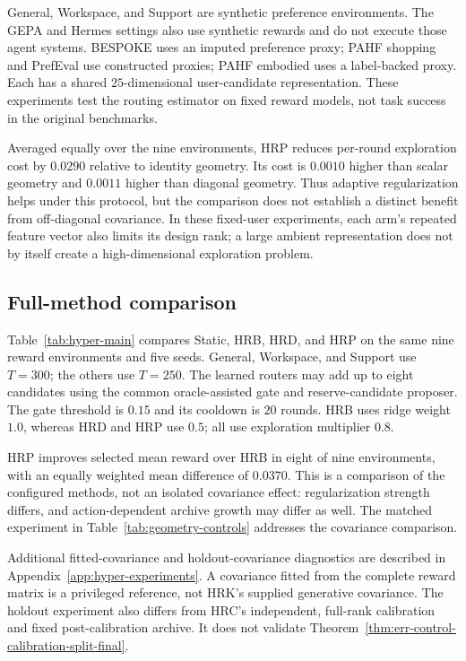 \documentclass{article} %
\begin{document}
General, Workspace, and Support are synthetic preference environments.
The GEPA and Hermes settings also use synthetic rewards and do not execute
those agent systems. BESPOKE uses an imputed preference proxy; PAHF shopping
and PrefEval use constructed proxies; PAHF embodied uses a label-backed
proxy. Each has a shared $25$-dimensional user-candidate representation.
These experiments test the routing estimator on fixed reward models, not
task success in the original benchmarks.



Averaged equally over the nine environments, HRP reduces per-round
exploration cost by $0.0290$ relative to identity geometry. Its cost is
$0.0010$ higher than scalar geometry and $0.0011$ higher than diagonal
geometry. Thus adaptive regularization helps under this protocol, but the
comparison does not establish a distinct benefit from off-diagonal
covariance. In these fixed-user experiments, each arm's repeated feature
vector also limits its design rank; a large ambient representation does
not by itself create a high-dimensional exploration problem.

\FloatBarrier
\subsection{Full-method comparison}
\label{sec:exp-baselines}

Table~\ref{tab:hyper-main} compares Static, HRB, HRD, and HRP on the same
nine reward environments and five seeds. General, Workspace, and Support
use $T=300$; the others use $T=250$. The learned routers may add up to eight
candidates using the common oracle-assisted gate and reserve-candidate
proposer. The gate threshold is $0.15$ and its cooldown is $20$ rounds.
HRB uses ridge weight $1.0$, whereas HRD and HRP use $0.5$; all use
exploration multiplier $0.8$.



HRP improves selected mean reward over HRB in eight of nine environments,
with an equally weighted mean difference of $0.0370$. This is a comparison
of the configured methods, not an isolated covariance effect: regularization
strength differs, and action-dependent archive growth may differ as well.
The matched experiment in Table~\ref{tab:geometry-controls} addresses the
covariance comparison.

Additional fitted-covariance and holdout-covariance diagnostics are described
in Appendix~\ref{app:hyper-experiments}. A covariance fitted from the complete
reward matrix is a privileged reference, not HRK's supplied generative
covariance. The holdout experiment also differs from HRC's independent,
full-rank calibration and fixed post-calibration archive. It does not
validate Theorem~\ref{thm:err-control-calibration-split-final}.
\end{document}
